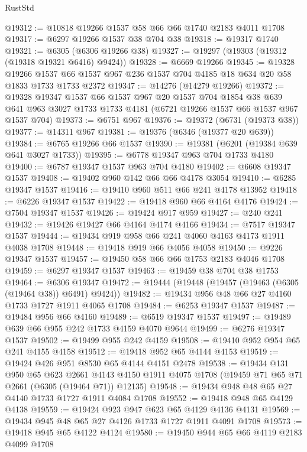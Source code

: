\begin{lexlean}{RustStd}
\begin{coremodule}
@19312 := @10818 @19266 @1537 @58 @66 @66 @1740 @2183 @4011 @1708
@19317 := @6297 @19266 @1537 @38 @704 @38
@19318 := @19317 @1740
@19321 := @6305 (@6306 @19266 @38)
@19327 := @19297 (@19303 (@19312 (@19318 @19321 @6416) @9424))
@19328 := @6669 @19266
@19345 := @19328
    @19266
    @1537
    @66
    @1537
    @967
    @236
    @1537
    @704
    @4185
    @18
    @634
    @20
    @58
    @1833
    @1733
    @1733
    @2372
@19347 := @14276 (@14279 @19266)
@19372 := @19328
    @19347
    @1537
    @66
    @1537
    @967
    @20
    @1537
    @704
    @1854
    @38
    @639
    @641
    @963
    @3027
    @1733
    @1733
    @4181
    (@6721 @19266 @1537 @66 @1537 @967 @1537 @704)
@19373 := @6751 @967
@19376 := @19372 (@6731 (@19373 @38))
@19377 := @14311 @967
@19381 := @19376 (@6346 (@19377 @20 @639))
@19384 := @6765 @19266 @66 @1537
@19390 := @19381 (@6201 (@19384 @639 @641 @3027 @1733))
@19395 := @6778 @19347 @963 @704 @1733 @4180
@19400 := @6787 @19347 @1537 @963 @704 @4180
@19402 := @6608 @19347 @1537
@19408 := @19402 @960 @142 @66 @66 @4178 @3054
@19410 := @6285 @19347 @1537
@19416 := @19410 @960 @511 @66 @241 @4178 @13952
@19418 := @6226 @19347 @1537
@19422 := @19418 @960 @66 @4164 @4176
@19424 := @7504 @19347 @1537
@19426 := @19424 @917 @959
@19427 := @240 @241
@19432 := @19426 @19427 @66 @4164 @4174 @4166
@19434 := @7517 @19347 @1537
@19444 := @19434 @919 @958 @66 @241 @4060 @4163 @4173 @1911 @4038 @1708
@19448 := @19418 @919 @66 @4056 @4058
@19450 := @9226 @19347 @1537
@19457 := @19450 @58 @66 @66 @1753 @2183 @4046 @1708
@19459 := @6297 @19347 @1537
@19463 := @19459 @38 @704 @38 @1753
@19464 := @6306 @19347
@19472 := @19444 (@19448 (@19457 (@19463 (@6305 (@19464 @38)) @6491) @9424))
@19482 := @19434 @956 @48 @66 @27 @4160 @1733 @1727 @1911 @4065 @1708
@19484 := @6253 @19347 @1537
@19487 := @19484 @956 @66 @4160
@19489 := @6519 @19347 @1537
@19497 := @19489 @639 @66 @955 @242 @1733 @4159 @4070 @9644
@19499 := @6276 @19347 @1537
@19502 := @19499 @955 @242 @4159
@19508 := @19410 @952 @954 @65 @241 @4155 @4158
@19512 := @19418 @952 @65 @4144 @4153
@19519 := @19424 @426 @951 @8530 @65 @4144 @4151 @2478
@19538 := @19434
    @131
    @950
    @65
    @623
    @2661
    @4143
    @4150
    @1911
    @4075
    @1708
    (@19459 @71 @65 @71 @2661 (@6305 (@19464 @71)) @12135)
@19548 := @19434 @948 @48 @65 @27 @4140 @1733 @1727 @1911 @4084 @1708
@19552 := @19418 @948 @65 @4129 @4138
@19559 := @19424 @923 @947 @623 @65 @4129 @4136 @4131
@19569 := @19434 @945 @48 @65 @27 @4126 @1733 @1727 @1911 @4091 @1708
@19573 := @19418 @945 @65 @4122 @4124
@19580 := @19450 @944 @65 @66 @4119 @2183 @4099 @1708

\end{coremodule}
\end{lexlean}
